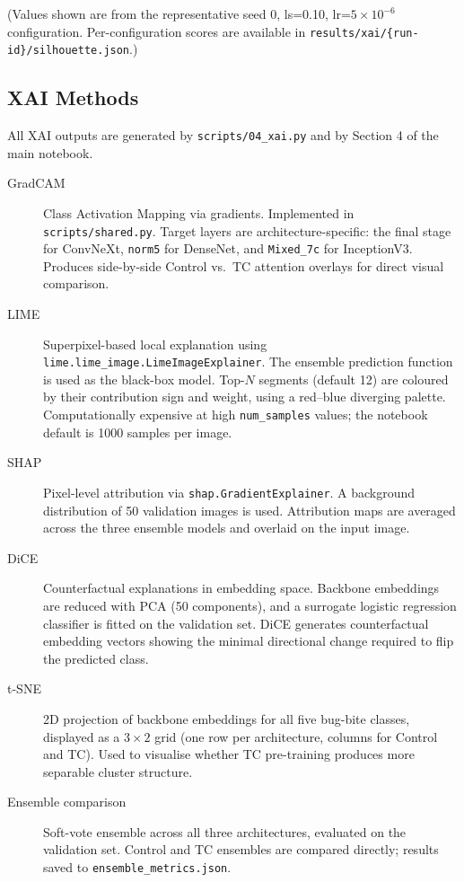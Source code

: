 \documentclass[12pt,a4paper]{article}
\begin{document}
(Values shown are from the representative seed 0, ls=0.10, lr=$5\times10^{-6}$
configuration. Per-configuration scores are available in
\texttt{results/xai/\{run-id\}/silhouette.json}.)

\subsection{XAI Methods}
\label{sec:pg-xai}

All XAI outputs are generated by \texttt{scripts/04\_xai.py} and by Section 4
of the main notebook.

\begin{description}
    \item[GradCAM] Class Activation Mapping via gradients. Implemented in
          \texttt{scripts/shared.py}. Target layers are architecture-specific:
          the final stage for ConvNeXt, \texttt{norm5} for DenseNet,
          and \texttt{Mixed\_7c} for InceptionV3. Produces side-by-side
          Control vs.\ TC attention overlays for direct visual comparison.

    \item[LIME] Superpixel-based local explanation using
          \texttt{lime.lime\_image.LimeImageExplainer}. The ensemble prediction
          function is used as the black-box model. Top-$N$ segments
          (default 12) are coloured by their contribution sign and weight,
          using a red--blue diverging palette. Computationally expensive at
          high \texttt{num\_samples} values; the notebook default is 1000
          samples per image.

    \item[SHAP] Pixel-level attribution via \texttt{shap.GradientExplainer}.
          A background distribution of 50 validation images is used.
          Attribution maps are averaged across the three ensemble models
          and overlaid on the input image.

    \item[DiCE] Counterfactual explanations in embedding space. Backbone
          embeddings are reduced with PCA (50 components), and a surrogate
          logistic regression classifier is fitted on the validation set.
          DiCE generates counterfactual embedding vectors showing the minimal
          directional change required to flip the predicted class.

    \item[t-SNE] 2D projection of backbone embeddings for all five bug-bite
          classes, displayed as a $3 \times 2$ grid (one row per architecture,
          columns for Control and TC). Used to visualise whether TC pre-training
          produces more separable cluster structure.

    \item[Ensemble comparison] Soft-vote ensemble across all three architectures,
          evaluated on the validation set. Control and TC ensembles are compared
          directly; results saved to \texttt{ensemble\_metrics.json}.
\end{description}
\end{document}
